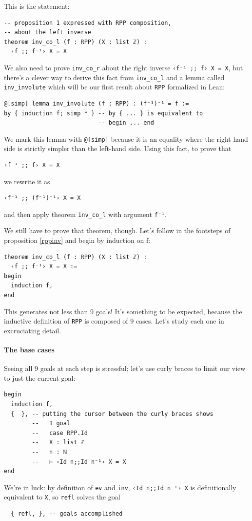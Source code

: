 \documentclass[oneside]{book}
\theoremstyle{definition}
\theoremstyle{remark}
\theoremstyle{plain}
\begin{document}
This is the statement:
\begin{lstlisting}
-- proposition 1 expressed with RPP composition,
-- about the left inverse
theorem inv_co_l (f : RPP) (X : list ℤ) :
  ‹f ;; f⁻¹› X = X
\end{lstlisting}
We also need to prove \lstinline{inv_co_r} about the right inverse \lstinline{‹f⁻¹ ;; f› X = X},
but there's a clever way to derive this fact from \lstinline{inv_co_l}
and a lemma called \lstinline{inv_involute} which will be our first result about \lstinline{RPP} formalized in Lean:
\begin{lstlisting}
@[simp] lemma inv_involute (f : RPP) : (f⁻¹)⁻¹ = f :=
by { induction f; simp * } -- by { ... } is equivalent to
                           -- begin ... end
\end{lstlisting}
We mark this lemma with \lstinline{@[simp]} because it is an equality where the right-hand side is strictly simpler than the left-hand side.
Using this fact, to prove that
\begin{lstlisting}
‹f⁻¹ ;; f› X = X
\end{lstlisting}
we rewrite it as
\begin{lstlisting}
‹f⁻¹ ;; (f⁻¹)⁻¹› X = X
\end{lstlisting}
and then apply theorem \lstinline{inv_co_l} with argument \lstinline{f⁻¹}.

We still have to prove that theorem, though.
Let's follow in the footsteps of proposition \ref{rppinv} and begin by induction on f:
\begin{lstlisting}
theorem inv_co_l (f : RPP) (X : list ℤ) :
  ‹f ;; f⁻¹› X = X :=
begin
  induction f,
end
\end{lstlisting}
This generates not less than 9 goals!
It's something to be expected, because the inductive definition of \lstinline{RPP} is composed of 9 cases.
Let's study each one in excruciating detail.

\paragraph{The base cases}

Seeing all 9 goals at each step is stressful;
let's use curly braces to limit our view to just the current goal:
\begin{lstlisting}
begin
  induction f,
  {  }, -- putting the cursor between the curly braces shows
        --   1 goal
        --   case RPP.Id
        --   X : list ℤ
        --   n : ℕ
        --   ⊢ ‹Id n;;Id n⁻¹› X = X
end
\end{lstlisting}
We're in luck: by definition of \lstinline{ev} and \lstinline{inv},
\lstinline{‹Id n;;Id n⁻¹› X} is definitionally equivalent to \lstinline{X},
so \lstinline{refl} solves the goal
\begin{lstlisting}
  { refl, }, -- goals accomplished
\end{lstlisting}
\end{document}

